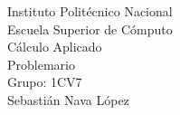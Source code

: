 \documentclass[letterpaper]{article}
\begin{document}
\begin{titlepage}
    \centering
    {\Huge Instituto Politécnico Nacional}\\[3ex]
    {\huge Escuela Superior de Cómputo}\\[8ex]
    {\huge Cálculo Aplicado}\\[12ex]
    {\Huge Problemario}\\[5ex]
 	{\Large Grupo: 1CV7\\[8ex]
    Sebastián Nava López\\[4ex]
    }
\end{titlepage}
\end{document}
